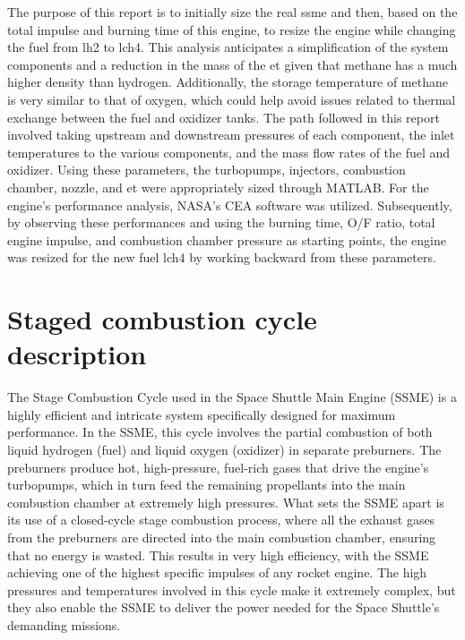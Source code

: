 
The purpose of this report is to initially size the real \acrfull{ssme} and then, based on the total impulse and burning time of this engine, to resize the engine while changing the fuel from \acrlong{lh2} to \acrfull{lch4}. 
This analysis anticipates a simplification of the system components and a reduction in the mass of the \acrfull{et} given that methane has a much higher density than hydrogen. Additionally, the storage temperature of methane is very similar to that of oxygen, which could help avoid issues related to thermal exchange between the fuel and oxidizer tanks.
The path followed in this report involved taking upstream and downstream pressures of each component, the inlet temperatures to the various components, and the mass flow rates of the fuel and oxidizer. Using these parameters, the turbopumps, injectors, combustion chamber, nozzle, and \acrlong{et} were appropriately sized through MATLAB. For the engine's performance analysis, NASA's CEA software was utilized. Subsequently, by observing these performances and using the burning time, O/F ratio, total engine impulse, and combustion chamber pressure as starting points, the engine was resized for the new fuel \acrshort{lch4} by working backward from these parameters.
\section{Staged combustion cycle description}
The Stage Combustion Cycle used in the Space Shuttle Main Engine (SSME) is a highly efficient and intricate system specifically designed for maximum performance.
In the SSME, this cycle involves the partial combustion of both liquid hydrogen (fuel) and liquid oxygen (oxidizer) in separate preburners. 
The preburners produce hot, high-pressure, fuel-rich gases that drive the engine's turbopumps, which in turn feed the remaining propellants into the main combustion chamber at extremely high pressures.
What sets the SSME apart is its use of a closed-cycle stage combustion process, where all the exhaust gases from the preburners are directed into the main combustion chamber, ensuring that no energy is wasted.
This results in very high efficiency, with the SSME achieving one of the highest specific impulses of any rocket engine.
The high pressures and temperatures involved in this cycle make it extremely complex, but they also enable the SSME to deliver the power needed for the Space Shuttle's demanding missions.




